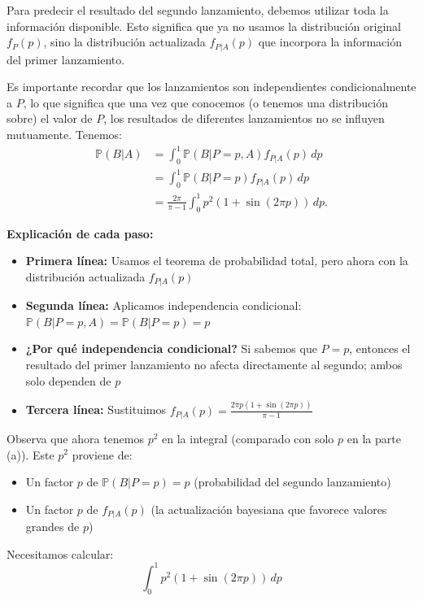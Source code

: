 \documentclass[
  11pt,
  letterpaper,
   addpoints,
  answers
  ]{exam}
\begin{document}
\begin{questions}
\begin{solution}
Para predecir el resultado del segundo lanzamiento, debemos utilizar toda la información disponible. Esto significa que ya no usamos la distribución original $f_P(p)$, sino la distribución actualizada $f_{P|A}(p)$ que incorpora la información del primer lanzamiento. 

Es importante recordar que los lanzamientos son independientes condicionalmente a $P$, lo que significa que una vez que conocemos (o tenemos una distribución sobre) el valor de $P$, los resultados de diferentes lanzamientos no se influyen mutuamente. Tenemos:
\begin{align}
\mathbb{P}(B | A) &= \int_0^1 \mathbb{P}(B | P = p, A)f_{P|A}(p) \, dp \\
&= \int_0^1 \mathbb{P}(B | P = p)f_{P|A}(p) \, dp \\
&= \frac{2\pi}{\pi - 1} \int_0^1 p^2(1 + \sin(2\pi p)) \, dp.
\end{align}

\textbf{Explicación de cada paso:}
\begin{itemize}
\item \textbf{Primera línea:} Usamos el teorema de probabilidad total, pero ahora con la distribución actualizada $f_{P|A}(p)$
\item \textbf{Segunda línea:} Aplicamos independencia condicional: $\mathbb{P}(B | P = p, A) = \mathbb{P}(B | P = p) = p$
\item \textbf{¿Por qué independencia condicional?} Si sabemos que $P = p$, entonces el resultado del primer lanzamiento no afecta directamente al segundo; ambos solo dependen de $p$
\item \textbf{Tercera línea:} Sustituimos $f_{P|A}(p) = \frac{2\pi p(1 + \sin(2\pi p))}{\pi - 1}$
\end{itemize}


Observa que ahora tenemos $p^2$ en la integral (comparado con solo $p$ en la parte (a)). Este $p^2$ proviene de:
\begin{itemize}
\item Un factor $p$ de $\mathbb{P}(B | P = p) = p$ (probabilidad del segundo lanzamiento)
\item Un factor $p$ de $f_{P|A}(p)$ (la actualización bayesiana que favorece valores grandes de $p$)
\end{itemize}

Necesitamos calcular:
\begin{equation}
\int_0^1 p^2(1 + \sin(2\pi p)) \, dp
\end{equation}


\end{solution}
\end{questions}
\end{document}
